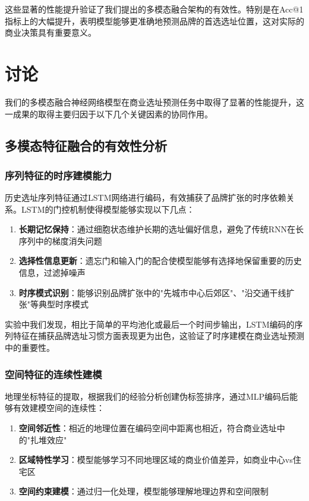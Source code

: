 \documentclass{article}
\begin{document}
这些显著的性能提升验证了我们提出的多模态融合架构的有效性。特别是在Acc@1指标上的大幅提升，表明模型能够更准确地预测品牌的首选选址位置，这对实际的商业决策具有重要意义。

\section{讨论}

我们的多模态融合神经网络模型在商业选址预测任务中取得了显著的性能提升，这一成果的取得主要归因于以下几个关键因素的协同作用。

\subsection{多模态特征融合的有效性分析}

\subsubsection{序列特征的时序建模能力}

历史选址序列特征通过LSTM网络进行编码，有效捕获了品牌扩张的时序依赖关系。LSTM的门控机制使得模型能够实现以下几点：

\begin{enumerate}
\item \textbf{长期记忆保持}：通过细胞状态维护长期的选址偏好信息，避免了传统RNN在长序列中的梯度消失问题
\item \textbf{选择性信息更新}：遗忘门和输入门的配合使模型能够有选择地保留重要的历史信息，过滤掉噪声
\item \textbf{时序模式识别}：能够识别品牌扩张中的"先城市中心后郊区"、"沿交通干线扩张"等典型时序模式
\end{enumerate}

实验中我们发现，相比于简单的平均池化或最后一个时间步输出，LSTM编码的序列特征在捕获品牌选址习惯方面表现更为出色，这验证了时序建模在商业选址预测中的重要性。

\subsubsection{空间特征的连续性建模}

地理坐标特征的提取，根据我们的经验分析创建伪标签排序，通过MLP编码后能够有效建模空间的连续性：

\begin{enumerate}
\item \textbf{空间邻近性}：相近的地理位置在编码空间中距离也相近，符合商业选址中的"扎堆效应"
\item \textbf{区域特性学习}：模型能够学习不同地理区域的商业价值差异，如商业中心vs住宅区
\item \textbf{空间约束建模}：通过归一化处理，模型能够理解地理边界和空间限制
\end{enumerate}
\end{document}
